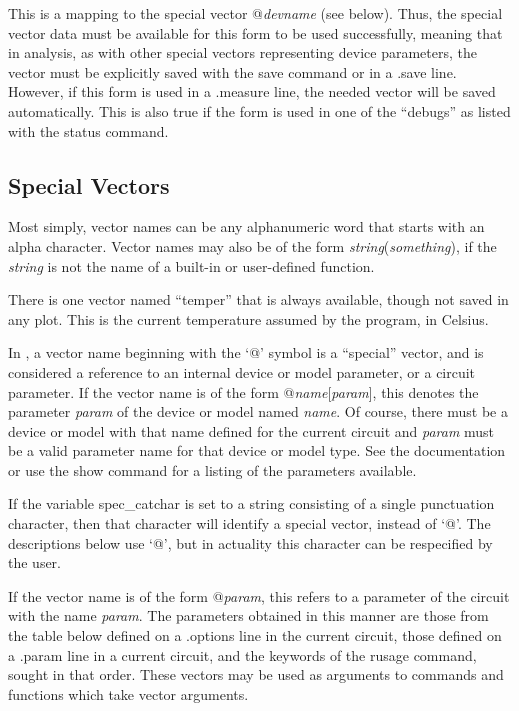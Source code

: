 This is a mapping to the special vector {\vt @}{\it devname\/}{\vt
[p]} (see below).  Thus, the special vector data must be available for
this form to be used successfully, meaning that in analysis, as with
other special vectors representing device parameters, the vector must
be explicitly saved with the {\cb save} command or in a {\vt .save}
line.  However, if this form is used in a {\vt .measure} line, the
needed vector will be saved automatically.  This is also true if the
form is used in one of the ``debugs'' as listed with the {\cb status}
command.

\subsection{Special Vectors}

Most simply, vector names can be any alphanumeric word that starts
with an alpha character.  Vector names may also be of the form {\it
string\/}({\it something\/}), if the {\it string} is not the name of a
built-in or user-defined function.

There is one vector named ``{\vt temper}'' that is always available,
though not saved in any plot.  This is the current temperature assumed
by the program, in Celsius.

In {\WRspice}, a vector name beginning with the `{\vt @}' symbol is a
``special'' vector, and is considered a reference to an internal
device or model parameter, or a circuit parameter.  If the vector name
is of the form {\vt @{\it name}[{\it param}]}, this denotes the
parameter {\it param} of the device or model named {\it name}.  Of
course, there must be a device or model with that name defined for the
current circuit and {\it param} must be a valid parameter name for
that device or model type.  See the documentation or use the {\cb
show} command for a listing of the parameters available.

If the variable {\et spec\_catchar} is set to a string consisting of a
single punctuation character, then that character will identify a
special vector, instead of `{\vt @}'.  The descriptions below use
`{\vt @}', but in actuality this character can be respecified by the
user.

If the vector name is of the form {\vt @}{\it param}, this refers to a
parameter of the circuit with the name {\it param}.  The parameters
obtained in this manner are those from the table below defined on a
{\vt .options} line in the current circuit, those defined on a {\vt
.param} line in a current circuit, and the keywords of the {\cb
rusage} command, sought in that order.  These vectors may be used as
arguments to commands and functions which take vector arguments.

